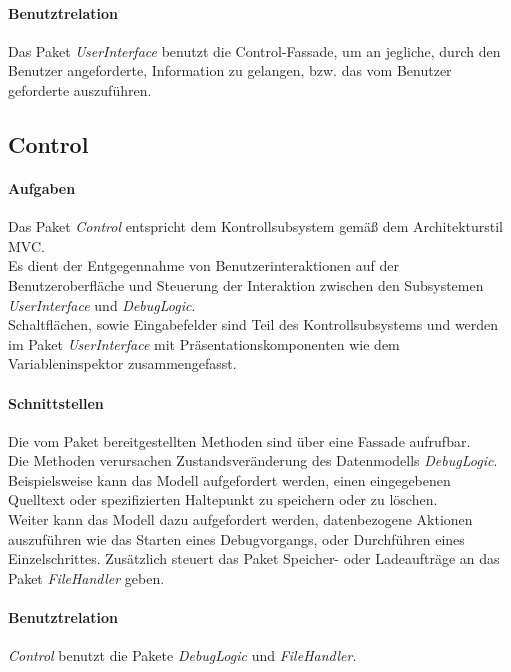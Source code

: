 \documentclass[parskip=full]{scrartcl}
\begin{document}
\paragraph{Benutztrelation} Das Paket \textit{UserInterface} benutzt die Control-Fassade, um an jegliche, durch den Benutzer angeforderte, Information zu gelangen, bzw. das vom Benutzer geforderte auszuführen. %


\subsection{Control}
\paragraph{Aufgaben}
    Das Paket \textit{Control} entspricht dem Kontrollsubsystem gemäß dem Architekturstil MVC.\\
    Es dient der Entgegennahme von Benutzerinteraktionen auf der Benutzeroberfläche und Steuerung der Interaktion zwischen den
    Subsystemen \textit{UserInterface} und \textit{DebugLogic}.\\
    Schaltflächen, sowie Eingabefelder sind Teil des Kontrollsubsystems und werden im Paket 
    \textit{UserInterface} mit Präsentationskomponenten wie dem Variableninspektor zusammengefasst.\\
\paragraph{Schnittstellen}
    Die vom Paket bereitgestellten Methoden sind über eine Fassade aufrufbar.\\
    Die Methoden verursachen Zustandsveränderung des Datenmodells \textit{DebugLogic}.\\
    Beispielsweise kann das Modell aufgefordert werden, einen eingegebenen Quelltext oder spezifizierten Haltepunkt
    zu speichern oder zu löschen.\\
    Weiter kann das Modell dazu aufgefordert werden, datenbezogene Aktionen auszuführen wie
    das Starten eines Debugvorgangs, oder Durchführen eines Einzelschrittes. Zusätzlich steuert das Paket Speicher- oder Ladeaufträge an das Paket \textit{FileHandler} geben. 
\paragraph{Benutztrelation}
    \textit{Control} benutzt die Pakete \textit{DebugLogic} und \textit{FileHandler}.%
\end{document}
